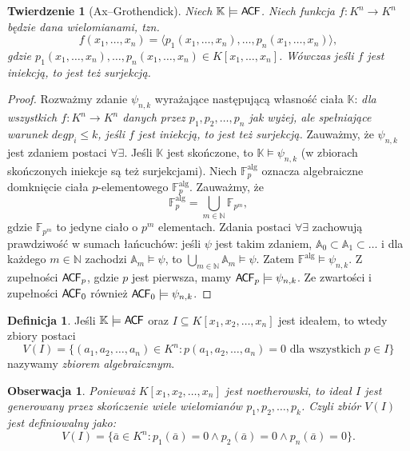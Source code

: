 \documentclass{article}
\newcommand{\N}{\mathbb{N}}
\newcommand{\A}{\mathbb{A}}
\newcommand{\F}{\mathbb{F}}
\newcommand{\K}{\mathbb{K}}
\theoremstyle{plain}
\newtheorem{tw}[thm]{Twierdzenie}
\newtheorem{obs}[thm]{Obserwacja}
\theoremstyle{definition}
\newtheorem{df}[thm]{Definicja}
\theoremstyle{remark}
\newcommand{\ACF}{\mathsf{A \mkern-2.0mu C \mkern-1.1mu F}}
\begin{document}
\begin{tw}[Ax--Grothendick]
	Niech $\mathbb{K} \models \ACF$.
	Niech funkcja $f \colon K^n \rightarrow K^n$ będzie dana wielomianami, tzn. $$f(x_1, \ldots, x_n) = \langle p_1(x_1, \ldots, x_n), \ldots, p_n(x_1, \ldots, x_n)\rangle ,$$ gdzie $p_1(x_1, \ldots, x_n), \ldots, p_n(x_1, \ldots, x_n) \in K[x_1, \ldots, x_n]$. %
	Wówczas jeśli $f$ jest iniekcją, to jest też surjekcją.
\end{tw}
\begin{proof}
	Rozważmy zdanie $\psi_{n,k}$ wyrażające następującą własność ciała $\K$:
	\textit{dla wszystkich $f \colon K^n \rightarrow K^n$ danych przez $p_1, p_2, \ldots, p_n$ jak wyżej, ale spełniające warunek $deg p_i \leq k$, jeśli $f$ jest iniekcją, to jest też surjekcją. }
	Zauważmy, że $\psi_{n,k}$ jest zdaniem postaci $\forall \exists$.
	Jeśli $\K$ jest skończone, to $\K \models \psi_{n,k}$ (w zbiorach skończonych iniekcje są też surjekcjami). %
	Niech $\F^{\text{alg}}_{p}$ oznacza algebraiczne domknięcie ciała $p$-elementowego $\F^{\text{alg}}_p$.
	Zauważmy, że $$\F^{\text{alg}}_{p} = \bigcup_{m \in \N} \F_{p^m},$$ gdzie $\F_{p^m}$ to jedyne ciało o $p^m$ elementach.
	Zdania postaci $\forall \exists$ zachowują prawdziwość w sumach łańcuchów:
	jeśli $\psi$ jest takim zdaniem, $\A_0 \subset \A_1 \subset \ldots $ i dla każdego $m \in \N$ zachodzi $\A_m \models \psi$, to $\bigcup_{m \in \N} \A_m \models \psi$.
	Zatem $\F^{\text{alg}} \models \psi_{n,k}$. %
	Z zupełności $\ACF_p$, gdzie $p$ jest pierwsza, mamy $\ACF_p \models \psi_{n,k}$.
	Ze zwartości i zupełności $\ACF_0$ również $\ACF_0 \models \psi_{n,k}$.

\end{proof}

\begin{df}
	Jeśli $\K \models \ACF$ oraz $I \subseteq K[x_1, x_2, \ldots, x_n ]$ jest ideałem, to wtedy zbiory postaci $$V(I) = \{(a_1, a_2, \ldots, a_n) \in K^n \colon p( a_1, a_2, \ldots, a_n ) = 0 \text{ dla wszystkich } p \in I\}$$ nazywamy \textit{zbiorem algebraicznym}.
\end{df}


\begin{obs}
	Ponieważ $K[x_1, x_2, \ldots, x_n ]$ jest noetherowski, to ideał $I$ jest generowany przez skończenie wiele wielomianów $p_1, p_2, \ldots, p_k$.
	Czyli zbiór $V(I)$ jest definiowalny jako:
	$$V(I) = \{ \bar{a} \in K^n \colon p_1(\bar{a}) = 0 \wedge p_2(\bar{a}) = 0 \wedge p_n(\bar{a})=0 \}.$$
\end{obs}
\end{document}
